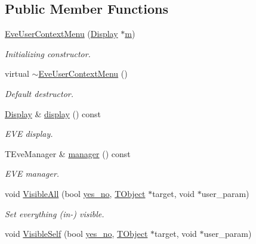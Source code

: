 \subsection*{Public Member Functions}
\begin{DoxyCompactItemize}
\item 
\hyperlink{class_d_d4hep_1_1_eve_user_context_menu_a2ea274ad2ba442a5ecfa2b438ee4d4aa}{Eve\+User\+Context\+Menu} (\hyperlink{class_d_d4hep_1_1_display}{Display} $\ast$\hyperlink{_volumes_8cpp_a6fc379aaec47ce424b00d8ffda2a6c59}{m})
\begin{DoxyCompactList}\small\item\em Initializing constructor. \end{DoxyCompactList}\item 
virtual \hyperlink{class_d_d4hep_1_1_eve_user_context_menu_a48d1bbc000743f3a363ea230ab4eeb0c}{$\sim$\+Eve\+User\+Context\+Menu} ()
\begin{DoxyCompactList}\small\item\em Default destructor. \end{DoxyCompactList}\item 
\hyperlink{class_d_d4hep_1_1_display}{Display} \& \hyperlink{class_d_d4hep_1_1_eve_user_context_menu_abd487675cc72b214d613cd34d57a9230}{display} () const
\begin{DoxyCompactList}\small\item\em E\+VE display. \end{DoxyCompactList}\item 
T\+Eve\+Manager \& \hyperlink{class_d_d4hep_1_1_eve_user_context_menu_af1d8f67a8ce80010f1848bf0cdd9e579}{manager} () const
\begin{DoxyCompactList}\small\item\em E\+VE manager. \end{DoxyCompactList}\item 
void \hyperlink{class_d_d4hep_1_1_eve_user_context_menu_ac41f26a1ef86468fb37da4a1fad9b4df}{Visible\+All} (bool \hyperlink{namespace_d_d4hep_a9b6e2c5ab00340e93017e18604b0cb85}{yes\+\_\+no}, \hyperlink{class_t_object}{T\+Object} $\ast$target, void $\ast$user\+\_\+param)
\begin{DoxyCompactList}\small\item\em Set everything (in-\/) visible. \end{DoxyCompactList}\item 
void \hyperlink{class_d_d4hep_1_1_eve_user_context_menu_a2c1bc8b4c3aa1fbedb1eed0c26b2fe65}{Visible\+Self} (bool \hyperlink{namespace_d_d4hep_a9b6e2c5ab00340e93017e18604b0cb85}{yes\+\_\+no}, \hyperlink{class_t_object}{T\+Object} $\ast$target, void $\ast$user\+\_\+param)

\end{DoxyCompactItemize}
